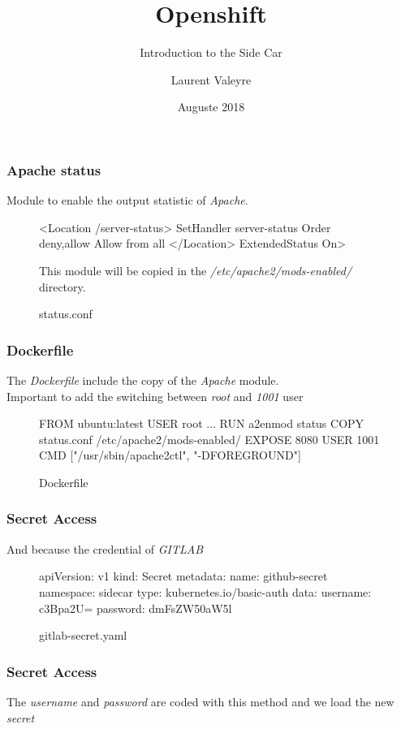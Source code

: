 \documentclass{beamer}
\title{Openshift}
\subtitle{Introduction to the Side Car}
\author{Laurent Valeyre}
\institute{Orange}
\date{Auguste 2018}
\begin{document}
\frame{\titlepage}




\begin{frame}[fragile]
  \frametitle{Apache status}
  Module to enable the output statistic of \emph{Apache}.
  
  \begin{figure}
    \begin{apachecode}
      <Location /server-status>
      SetHandler server-status
      Order deny,allow
      Allow from all
      </Location> ExtendedStatus On>
    \end{apachecode}
    \caption{status.conf}
    
    This module will be copied in the \emph{/etc/apache2/mods-enabled/} directory.
  \end{figure}
\end{frame}

\begin{frame}[fragile]
  \frametitle{Dockerfile}
  The \emph{Dockerfile} include the copy of the \emph{Apache} module.\\
  Important to add the switching between \textit{root} and \textit{1001} user
  \begin{figure}
    \begin{dockercode}
      FROM ubuntu:latest
      USER root
      ...
      RUN a2enmod status
      COPY status.conf /etc/apache2/mods-enabled/
      EXPOSE 8080
      USER 1001
      CMD ["/usr/sbin/apache2ctl", "-DFOREGROUND"]
    \end{dockercode}
    \caption{Dockerfile}
  \end{figure}
  
\end{frame}

\begin{frame}[fragile]
  \frametitle{Secret Access}
  And because the credential of \emph{GITLAB}
  \begin{figure}
    \begin{yamlcode}
      apiVersion: v1
      kind: Secret
      metadata:
        name: github-secret
        namespace: sidecar
      type: kubernetes.io/basic-auth
      data:
        username: c3Bpa2U=
        password: dmFsZW50aW5l
    \end{yamlcode}
    \caption{gitlab-secret.yaml}
  \end{figure}
\end{frame}

\begin{frame}[fragile]
  \frametitle{Secret Access}
  The \emph{username} and \emph{password} are coded with this method and we load the new \emph{secret}
\end{frame}
\end{document}
